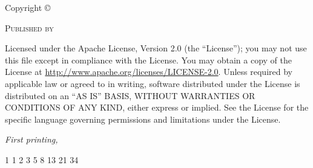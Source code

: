 \newpage
\thispagestyle{empty} %

\begin{fullwidth}
\vspace*{105mm} %
\setlength{\parindent}{-7mm} %
\setlength{\parskip}{\baselineskip} %

\noindent
\par Copyright \copyright\ \the\year\ %

\par\textsc{Published by \publisher}

\par Licensed under the Apache License, Version 2.0 (the ``License''); you may not
use this file except in compliance with the License. You may obtain a copy
of the License at \url{http://www.apache.org/licenses/LICENSE-2.0}. Unless
required by applicable law or agreed to in writing, software distributed
under the License is distributed on an \textsc{``AS IS'' BASIS, WITHOUT
WARRANTIES OR CONDITIONS OF ANY KIND}, either express or implied. See the
License for the specific language governing permissions and limitations
under the License.

\par\textit{First printing, \monthyear}

1 1 2 3 5 8 13 21 34

\end{fullwidth}
